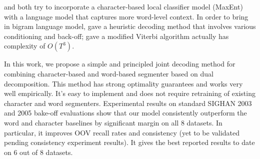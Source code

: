 \cite{Lin:2009:CICLing} and \cite{Wang:2006:SIGHAN} both try to incorporate a character-based local classifier model (MaxEnt) with a language model that captures more word-level context.
In order to bring in bigram language model,   gave a heuristic decoding method that involves various conditioning and back-off;  gave a modified Viterbi algorithm actually has complexity of $O(T^3)$. 

In this work, we propose a simple and principled joint decoding method for combining character-based and word-based segmenter based on dual decomposition. This method has strong optimality guarantees and works very well empirically. It's easy to implement and does not require retraining of existing character and word segmenters.
Experimental results on standard SIGHAN 2003 and 2005 bake-off evaluations show that our model consistently outperform the word and character baselines by significant margin on all 8 datasets. In particular, it improves OOV recall rates and consistency (yet to be validated pending consistency experiment results). It gives the best reported results to date on 6 out of 8 datasets. 
